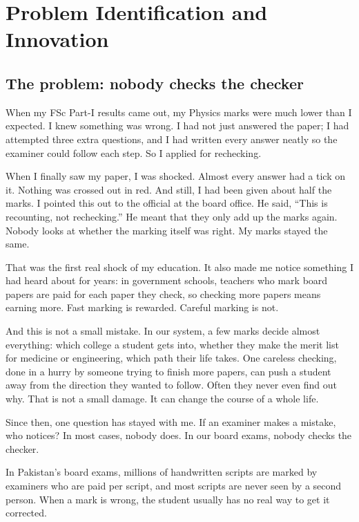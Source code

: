 \chapter{Problem Identification and Innovation}
\label{sec:problem}

\section{The problem: nobody checks the checker}

When my FSc Part-I results came out, my Physics marks were much lower than I expected. I knew something was wrong.
I had not just answered the paper; I had attempted three extra questions, and I had written every answer neatly so the
examiner could follow each step. So I applied for rechecking.

When I finally saw my paper, I was shocked. Almost every answer had a tick on it. Nothing was crossed out in red. And
still, I had been given about half the marks. I pointed this out to the official at the board office. He said,
``This is recounting, not rechecking.'' He meant that they only add up the marks again. Nobody looks at whether the
marking itself was right. My marks stayed the same.

That was the first real shock of my education. It also made me notice something I had heard about for years: in
government schools, teachers who mark board papers are paid for each paper they check, so checking more papers
means earning more. Fast marking is rewarded. Careful marking is not.

And this is not a small mistake. In our system, a few marks decide almost everything: which college a student gets
into, whether they make the merit list for medicine or engineering, which path their life takes. One careless checking,
done in a hurry by someone trying to finish more papers, can push a student away from the direction they wanted to
follow. Often they never even find out why. That is not a small damage. It can change the course of a whole life.

Since then, one question has stayed with me. If an examiner makes a mistake, who notices? In most cases, nobody does.
In our board exams, nobody checks the checker.

\begin{keybox}
In Pakistan's board exams, millions of handwritten scripts are marked by examiners who are paid per script, and most
scripts are never seen by a second person. When a mark is wrong, the student usually has no real way to get it corrected.
\end{keybox}

